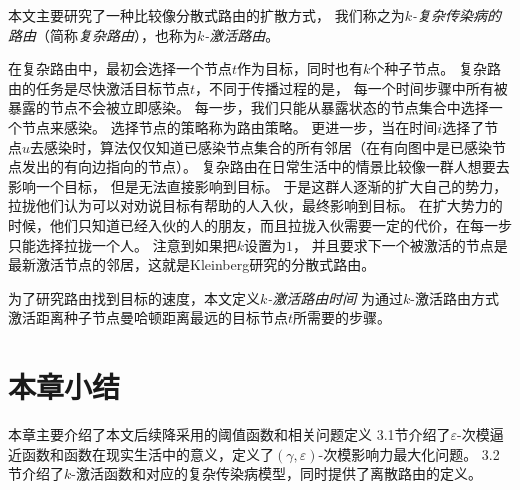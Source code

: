 本文主要研究了一种比较像分散式路由\cite{Kleinberg2000small}的扩散方式，
我们称之为{\it $k$-复杂传染病的路由}（简称{\it 复杂路由}），也称为{\it $k$-激活路由}。

在复杂路由中，最初会选择一个节点$t$作为目标，同时也有$k$个种子节点。
复杂路由的任务是尽快激活目标节点$t$，不同于传播过程的是，
每一个时间步骤中所有被暴露的节点不会被立即感染。
每一步，我们只能从暴露状态的节点集合中选择一个节点来感染。
选择节点的策略称为路由策略。
更进一步，当在时间$i$选择了节点$u$去感染时，算法仅仅知道已感染节点集合的所有邻居（在有向图中是已感染节点发出的有向边指向的节点）。
复杂路由在日常生活中的情景比较像一群人想要去影响一个目标，
但是无法直接影响到目标。
于是这群人逐渐的扩大自己的势力，拉拢他们认为可以对劝说目标有帮助的人入伙，最终影响到目标。
在扩大势力的时候，他们只知道已经入伙的人的朋友，而且拉拢入伙需要一定的代价，在每一步只能选择拉拢一个人。
注意到如果把$k$设置为$1$，
并且要求下一个被激活的节点是最新激活节点的邻居，这就是Kleinberg研究的分散式路由\cite{Kleinberg2000small}。

为了研究路由找到目标的速度，本文定义{\it $k$-激活路由时间}
为通过$k$-激活路由方式激活距离种子节点曼哈顿距离最远的目标节点$t$所需要的步骤。


\section{本章小结}
本章主要介绍了本文后续降采用的阈值函数和相关问题定义
3.1节介绍了$\varepsilon$-次模逼近函数和函数在现实生活中的意义，定义了$(\gamma,\varepsilon)$-次模影响力最大化问题。
3.2节介绍了$k$-激活函数和对应的复杂传染病模型，同时提供了离散路由的定义。